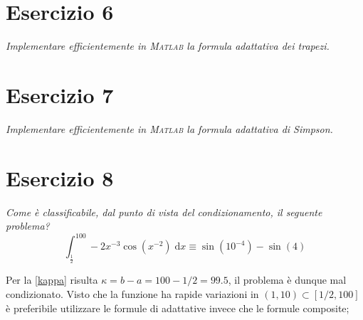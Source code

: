 
\section{Esercizio 6}
\label{sub:es6}
\emph{Implementare efficientemente in \textsc{Matlab} la formula adattativa dei trapezi.}
\begin{sol}
	
\end{sol}


\section{Esercizio 7}
\label{sub:es7}
\emph{Implementare efficientemente in \textsc{Matlab} la formula adattativa di Simpson.}
\begin{sol}
	
\end{sol}


\section{Esercizio 8}
\label{sub:es8}
\emph{Come è classificabile, dal punto di vista del condizionamento, il seguente problema?
			$$\int_{\frac{1}{2}}^{100}-2x^{-3}\cos\left(x^{-2}\right)\;\mathrm{d}x\equiv\sin\left(10^{-4}\right)-\sin(4)$$}
\begin{sol}
	
	\normalfont
	Per la \ref{kappa} risulta $\kappa=b-a=100-1/2=99.5$, il problema è dunque mal condizionato.
	Visto che la funzione ha rapide variazioni in $(1,10)\subset[1/2,100]$ è preferibile
	utilizzare le formule di adattative invece che le formule composite;
\end{sol}


